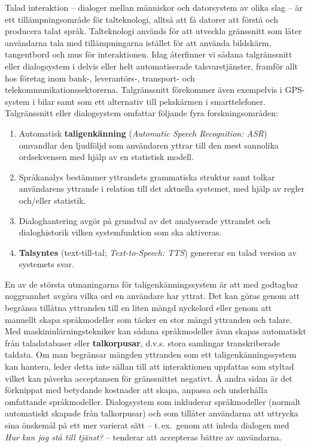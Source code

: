 \begin{multicols}{2}
Talad interaktion -- dialoger mellan människor och datorsystem av
olika slag -- är ett tillämpningsområde för talteknologi, alltså att
få datorer att förstå och producera talat språk. Talteknologi används
för att utveckla gränssnitt som låter användarna tala med
tillämpningarna istället för att använda bildskärm, tangentbord och
mus för interaktionen. Idag återfinner vi sådana talgränssnitt eller
dialogsystem i delvis eller helt automatiserade talsvarstjänster,
framför allt hos företag inom \mbox{bank-,} leverantörs-, transport-
och telekommunikationssektorerna. Talgränssnitt förekommer även
exempelvis i GPS-system i bilar samt som ett alternativ till
pek\-skärm\-en i smarttelefoner. Talgränssnitt eller dialogsystem omfattar följande fyra
forskningsområden:

\begin{enumerate}
\item Automatisk \textbf{taligenkänning} (\emph{Automatic Speech
  Recognition: ASR}) omvandlar den ljudföljd som användaren yttrar
  till den mest sannolika ordsekvensen med hjälp av en statistisk
  modell.
\item Språkanalys bestämmer yttrandets grammatiska struktur samt
  tolkar användarens yttrande i relation till det aktuella systemet,
  med hjälp av regler och/eller statistik.
\item Dialoghantering avgör på grundval av det analyserade yttrandet
  och dialoghistorik vilken systemfunktion som ska aktiveras.
\item \textbf{Talsyntes} (text-till-tal; \emph{Text-to-Speech: TTS})
  genererar en talad version av systemets svar.
\end{enumerate}

En av de största utmaningarna för tal\-igen\-känn\-ings\-sys\-tem är att med
godtagbar noggrannhet avgöra vilka ord en användare har yttrat. Det
kan göras genom att begränsa tillåtna yttranden till en liten mängd
nyckelord eller genom att manuellt skapa språkmodeller som täcker en
stor mängd yttranden och talare. Med maskininlärningstekniker kan
sådana språkmodeller ävan skapas automatiskt från taladatabaser eller
\textbf{talkorpusar}, d.v.s. stora samlingar transkriberade
taldata. Om man begränsar mängden yttranden som ett
taligenkänningssystem kan hantera, leder detta inte sällan till att
interaktionen uppfattas som styltad vilket kan påverka acceptansen för
gränssnittet negativt. Å andra sidan är det förknippat med betydande
kostnader att skapa, anpassa och underhålla omfattande
språkmodeller. Dialogsystem som inkluderar språkmodeller (normalt
automatiskt skapade från talkorpusar) och som tillåter användarna att
uttrycka sina önskemål på ett mer varierat sätt -- t.\,ex.~genom att
inleda dialogen med \textit{Hur kan jag stå till tjänst?} -- tenderar
att accepteras bättre av användarna.


\end{multicols}
